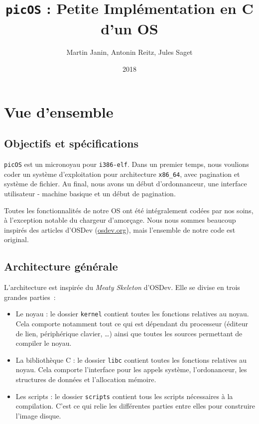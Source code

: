 \documentclass[a4paper, 11pt, twoside]{article}
\title{\texttt{picOS} : Petite Implémentation en C d'un OS}
\author{Martin Janin, Antonin Reitz, Jules Saget}
\date{2018}
\begin{document}
\maketitle

\section{Vue d'ensemble}

\subsection{Objectifs et spécifications}

\texttt{picOS} est un micronoyau pour \texttt{i386-elf}. Dans un premier temps, nous
voulions coder un système d'exploitation pour architecture \texttt{x86\_64}, avec
pagination et système de fichier. Au final, nous avons un début d'ordonnanceur, une 
interface utilisateur - machine basique et un début de pagination.

Toutes les fonctionnalités de notre OS ont été intégralement codées par nos
soins, à l'exception notable du chargeur d'amorçage. Nous nous sommes beaucoup
inspirés des articles d'OSDev (\url{osdev.org}), mais l'ensemble de notre code est
original.

\subsection{Architecture générale}

L'architecture est inspirée du \emph{Meaty Skeleton} d'OSDev. Elle se divise en
trois grandes parties~:
\begin{itemize}
  \item Le noyau : le dossier \texttt{kernel} contient toutes les fonctions
    relatives au noyau. Cela comporte notamment tout ce qui est dépendant du
    processeur (éditeur de lien, périphérique clavier, \ldots) ainsi que toutes
    les sources permettant de compiler le noyau.
  \item La bibliothèque C : le dossier \texttt{libc} contient toutes les
    fonctions relatives au noyau. Cela comporte l'interface pour les appels
    système, l'ordonanceur, les structures de données et l'allocation mémoire.
  \item Les scripts : le dossier \texttt{scripts} contient tous les scripts
    nécessaires à la compilation. C'est ce qui relie les différentes parties
    entre elles pour construire l'image disque.
\end{itemize}
\end{document}
